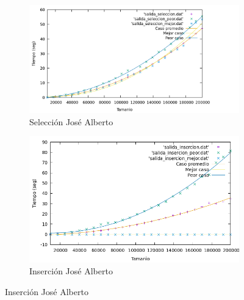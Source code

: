 \documentclass[10pt,a4paper]{article}
\begin{document}
\begin{figure}[h!]
	\begin{subfigure}{.5\textwidth}
		\centering
		\includegraphics[scale=0.12]{../../Images/Grafica_casos_seleccion_Joshoccas.png}
		\caption{Selección José Alberto}
	\end{subfigure}
	\hfill
	\begin{subfigure}{.5\textwidth}
		\centering
		\includegraphics[scale=0.3]{../../Images/Grafica_casos_insercion_Joshoccas.png}
		\caption{Inserción José Alberto}
	\end{subfigure}
\end{figure}
\end{document}
